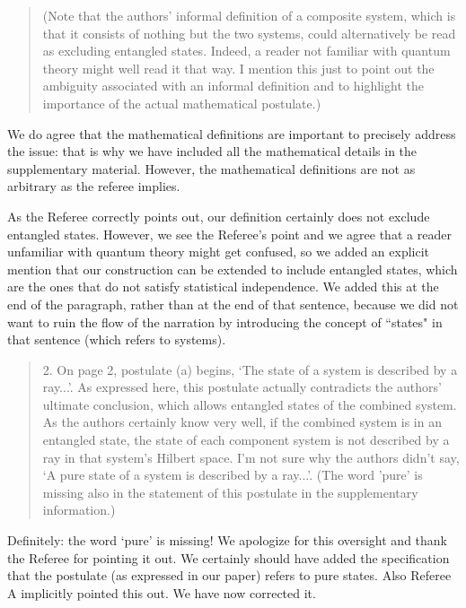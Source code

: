 \documentclass[11pt]{article}
\begin{document}
\begin{quote}
(Note that the authors' informal definition of a composite
system, which is that it consists of nothing but the two systems,
could alternatively be read as excluding entangled states. Indeed, a
reader not familiar with quantum theory might well read it that way. I
mention this just to point out the ambiguity associated with an
informal definition and to highlight the importance of the actual
mathematical postulate.)
\end{quote}

We do agree that the mathematical definitions are important to precisely
address the issue: that is why we have included all the mathematical
details in the supplementary material. However, the mathematical definitions
are not as arbitrary as the referee implies.

As the Referee correctly points out, our definition certainly does not
exclude entangled states. However, we see the Referee's point and we
agree that a reader unfamiliar with quantum theory might get confused,
so we added an explicit mention that our construction can be extended
to include entangled states, which are the ones that do not satisfy
statistical independence. We added this at the end of the paragraph,
rather than at the end of that sentence, because we did not want to
ruin the flow of the narration by introducing the concept of ``states"
in that sentence (which refers to systems).

\begin{quote}
2. On page 2, postulate (a) begins, `The state of a system
is described by a ray...'. As expressed here, this postulate actually
contradicts the authors' ultimate conclusion, which allows entangled
states of the combined system. As the authors certainly know very
well, if the combined system is in an entangled state, the state of
each component system is not described by a ray in that system's
Hilbert space. I'm not sure why the authors didn't say, `A pure state
of a system is described by a ray...'. (The word 'pure' is missing
also in the statement of this postulate in the supplementary
information.)
\end{quote}

Definitely: the word `pure' is missing! We apologize for this
oversight and thank the Referee for pointing it out. We certainly
should have added the specification that the postulate (as expressed
in our paper) refers to pure states. Also Referee A implicitly pointed
this out. We have now corrected it.
\end{document}

